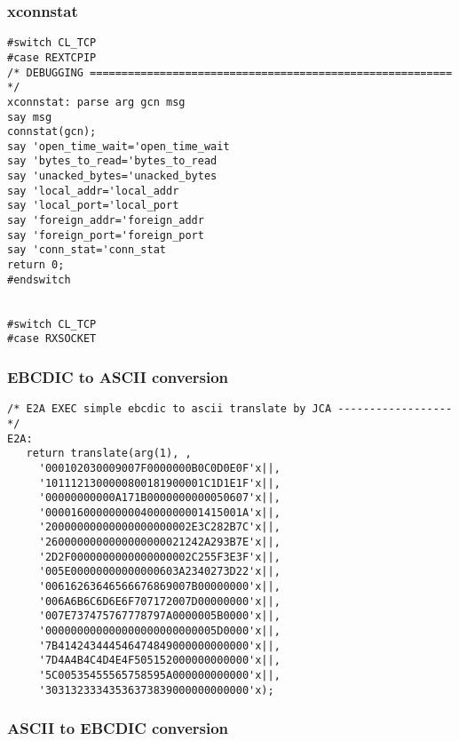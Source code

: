 \subsubsection{xconnstat}

\def\LPtopF{xconnstat}

\begin{verbatim}
#switch CL_TCP
#case REXTCPIP
/* DEBUGGING ========================================================= */
xconnstat: parse arg gcn msg
say msg
connstat(gcn);
say 'open_time_wait='open_time_wait
say 'bytes_to_read='bytes_to_read
say 'unacked_bytes='unacked_bytes
say 'local_addr='local_addr
say 'local_port='local_port
say 'foreign_addr='foreign_addr
say 'foreign_port='foreign_port
say 'conn_stat='conn_stat
return 0;
#endswitch


#switch CL_TCP
#case RXSOCKET
\end{verbatim}

\subsubsection{EBCDIC to ASCII conversion}

\def\LPtopF{EBCDIC to ASCII conversion}

\begin{verbatim}
/* E2A EXEC simple ebcdic to ascii translate by JCA ------------------ */
E2A:
   return translate(arg(1), ,
     '000102030009007F0000000B0C0D0E0F'x||,
     '1011121300000800181900001C1D1E1F'x||,
     '00000000000A171B0000000000050607'x||,
     '0000160000000004000000001415001A'x||,
     '20000000000000000000002E3C282B7C'x||,
     '2600000000000000000021242A293B7E'x||,
     '2D2F0000000000000000002C255F3E3F'x||,
     '005E00000000000000603A2340273D22'x||,
     '00616263646566676869007B00000000'x||,
     '006A6B6C6D6E6F707172007D00000000'x||,
     '007E737475767778797A0000005B0000'x||,
     '000000000000000000000000005D0000'x||,
     '7B414243444546474849000000000000'x||,
     '7D4A4B4C4D4E4F505152000000000000'x||,
     '5C00535455565758595A000000000000'x||,
     '30313233343536373839000000000000'x);
\end{verbatim}

\subsubsection{ASCII to EBCDIC conversion}

\def\LPtopF{ASCII to EBCDIC conversion}

